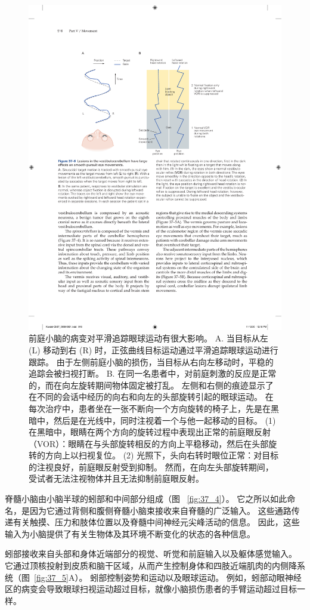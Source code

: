 \begin{figure}[htbp]
	\centering
	\includegraphics[width=0.8\linewidth]{chap37/fig_37_6}
	\caption{前庭小脑的病变对平滑追踪眼球运动有很大影响。 A. 当目标从左 (L) 移动到右 (R) 时，正弦曲线目标运动通过平滑追踪眼球运动进行跟踪。 由于左侧前庭小脑的损伤，当目标从右向左移动时，平稳的追踪会被扫视打断。 B. 在同一名患者中，对前庭刺激的反应是正常的，而在向左旋转期间物体固定被打乱。 左侧和右侧的痕迹显示了在不同的会话中经历的向右和向左的头部旋转引起的眼球运动。 在每次治疗中，患者坐在一张不断向一个方向旋转的椅子上，先是在黑暗中，然后是在光线中，同时注视着一个与他一起移动的目标。 (1) 在黑暗中，眼睛在两个方向的旋转过程中表现出正常的前庭眼反射（VOR）：眼睛在与头部旋转相反的方向上平稳移动，然后在头部旋转的方向上以扫视复位。 (2) 光照下，头向右转时眼位正常：对目标的注视良好，前庭眼反射受到抑制。 然而，在向左头部旋转期间，受试者无法注视物体并且无法抑制前庭眼反射。}
	\label{fig:37_6}
\end{figure}


脊髓小脑由小脑半球的蚓部和中间部分组成（图 ~\ref{fig:37_4}）。
它之所以如此命名，是因为它通过背侧和腹侧脊髓小脑束接收来自脊髓的广泛输入。
这些通路传递有关触摸、压力和肢体位置以及脊髓中间神经元尖峰活动的信息。
因此，这些输入为小脑提供了有关生物体及其环境不断变化的状态的各种信息。


蚓部接收来自头部和身体近端部分的视觉、听觉和前庭输入以及躯体感觉输入。
它通过顶核投射到皮质和脑干区域，从而产生控制身体和四肢近端肌肉的内侧降系统（图~\ref{fig:37_5}A）。
蚓部控制姿势和运动以及眼球运动。
例如，蚓部动眼神经区的病变会导致眼球扫视运动超过目标，就像小脑损伤患者的手臂运动超过目标一样。


